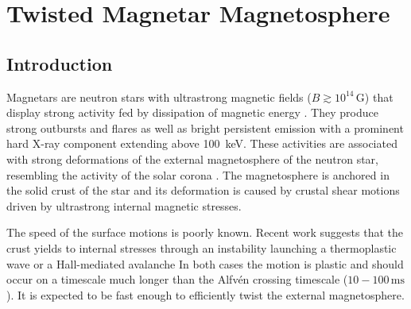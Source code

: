 \def\bE{{\mathbf E}}
\def\bB{{\mathbf B}}
\def\bj{{\mathbf j}}
\def\bv{{\mathbf v}}
\def\br{{\mathbf r}}
\def\rhoGJ{\rho_{\rm GJ}}
\def\beq{\begin{equation}}
\def\eeq{\end{equation}}
\def\Eq{Equation}
\def\gthr{\gamma_{\rm thr}}
  \def\tev{t_{\rm ohm}}
\def\tA{t_{\rm A}}
\def\gDL{\gamma_{\rm DL}}
\def\fmax{f_{\max}}
\def\tA{t_{\rm A}}
\def\Etw{E_{\rm twist}}
\def\rout{r_{\rm out}}
\def\ttw{t_{\rm shear}}
\def\Rs{R_\star}
\def\Bs{B_\star}
\def\tsim{t_{\rm sim}}
\def\lgap{\ell_{\rm gap}}
\def\Egap{E_{\rm gap}}
\def\Phigap{\Phi_{\rm gap}}
\def\Phithr{\Phi_{\rm thr}}
\def\M{{\cal M}}

\chapter{Twisted Magnetar Magnetosphere}
\label{chap:magnetar}

\section{Introduction}

Magnetars are neutron stars with ultrastrong magnetic fields ($B \gtrsim
10^{14}\,\mathrm{G}$) that display  strong activity fed by dissipation of magnetic energy
\citetext{see e.g. \citealp{mereghetti_strongest_2008}; \citealp{turolla_magnetars:_2015} for reviews}.
They produce strong outbursts and flares as well as bright persistent emission
with a prominent hard X-ray component extending above 100~keV.
These activities are associated with strong
deformations of the external magnetosphere of the neutron star, resembling the activity
of the solar corona
\citep[e.g.][]{thompson_soft_1995}.
The magnetosphere is anchored in the solid crust of the star and its deformation
is caused by crustal shear motions driven by ultrastrong internal magnetic
stresses.

The speed of the surface motions is poorly known. Recent work suggests that
the crust yields to internal stresses through an instability launching a
thermoplastic wave
\citep{beloborodov_thermoplastic_2014}
or a Hall-mediated avalanche
\citep{li_magnetar_2016}
In both cases the motion is plastic and should occur on a timescale much longer
than the Alfv\'en crossing timescale ($10-100\,\mathrm{ms}$).
It is expected to be fast enough to efficiently twist the external magnetosphere.

